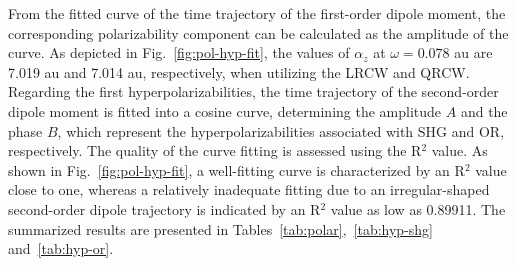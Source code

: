 From the fitted curve of the time trajectory of the first-order dipole moment, the corresponding polarizability component can be calculated as the amplitude of the curve. As depicted in Fig.~\ref{fig:pol-hyp-fit}, the values of $\alpha_{z}$ at $\omega=0.078$ au are 7.019 au and 7.014 au, respectively, when utilizing the LRCW and QRCW. Regarding the first hyperpolarizabilities, the time trajectory of the second-order dipole moment is fitted into a cosine curve, determining the amplitude $A$ and the phase $B$, which represent the hyperpolarizabilities associated with SHG and OR, respectively. The quality of the curve fitting is assessed using the R$^{2}$ value. As shown in Fig.~\ref{fig:pol-hyp-fit}, a well-fitting curve is characterized by an R$^{2}$ value close to one, whereas a relatively inadequate fitting due to an irregular-shaped second-order dipole trajectory is indicated by an R$^{2}$ value as low as 0.89911. The summarized results are presented in Tables~\ref{tab:polar},~\ref{tab:hyp-shg} and~\ref{tab:hyp-or}.

